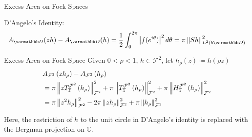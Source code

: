 \documentclass{reu_beamer}
\begin{document}
\begin{frame}{Excess Area on Fock Spaces}
    \begin{center}
        \small
        D'Angelo's Identity: 
        \[A_{\mathbb{D}}(zh) - A_{\mathbb{D}}(h) = \frac{1}{2}\int_0^{2\pi}\left|f(e^{i\theta})\right|^2d\theta = \pi \norm{Sh}_{L^{2}(b\mathbb{D})}^2\]
    \end{center}
    \begin{block}{Excess Area on Fock Space}
    Given $0 < \rho < 1$, $h\in \mathcal{F}^2 $, let \(h_\rho(z) \coloneq h(\rho z)\)
    \begin{align*}
        &A_{\mathcal{F}^2}\left(zh_{\rho}\right) - A_{\mathcal{F}^2}\left(h_{\rho}\right) \\
        &= \pi \left\Vert zT^{\mathcal{F}^2}_{\overline{z}}\left(h_{\rho}\right) \right\Vert_{\mathcal{F}^2}^2+\pi\left\Vert T^{\mathcal{F}^2}_{\overline{z}}\left(h_{\rho}\right) \right\Vert_{\mathcal{F}^2}^2+ \pi\left\Vert H^{\mathcal{F}^2}_{\overline{z}}\left(h_{\rho}\right) \right\Vert_{\mathcal{F}^2}^2\\
        &= \pi\left\Vert z^{2}h_\rho \right\Vert^2_{\mathcal{F}^2}-2\pi\left\Vert zh_\rho \right\Vert^2_{\mathcal{F}^2}+\pi\left\Vert h_\rho \right\Vert^2_{\mathcal{F}^2}
    \end{align*}
    \end{block}  
    Here, the restriction of \(h\) to the unit circle in D'Angelo's identity is replaced with the Bergman projection on $\mathbb{C}$.\\
\end{frame}
\end{document}
